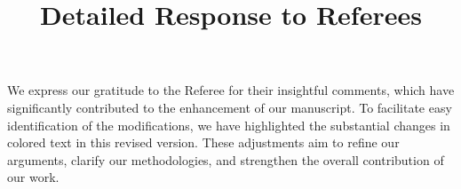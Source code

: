 \documentclass[10pt]{amsart}
\theoremstyle{definition}
\theoremstyle{remark}
\begin{document}
\title{\large Detailed Response to Referees}%

\date{}%

\maketitle

We express our gratitude to the Referee for their insightful comments, which have significantly contributed to the enhancement of our manuscript. To facilitate easy identification of the modifications, we have highlighted the substantial changes in colored text in this revised version. These adjustments aim to refine our arguments, clarify our methodologies, and strengthen the overall contribution of our work.%






\end{document}
